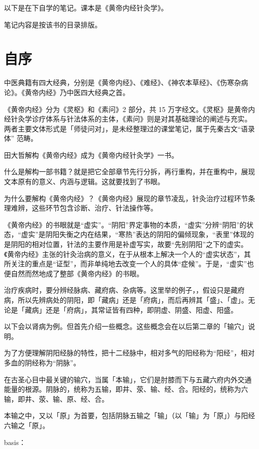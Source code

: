 \documentclass[
]{book}
\begin{document}
以下是在下自学的笔记。课本是《黄帝内经针灸学》。

笔记内容是按该书的目录排版。

\chapter{自序}\label{ux81eaux5e8f}

中医典籍有四大经典，分别是《黄帝内经》、《难经》、《神农本草经》、《伤寒杂病论》。《黄帝内经》乃中医四大经典之首。

《黄帝内经》分为《灵枢》和《素问》2 部分，共 15 万字经文。《灵枢》是黄帝内经针灸学诊疗体系与针法体系的主体，《素问》则是对其基础理论的阐述与充实。两者主要文体形式是「师徒问对」，是未经整理过的课堂笔记，属于先秦古文``语录体'' 范畴。

田大哲解构《黄帝内经》成为《黄帝内经针灸学》一书。

什么是解构一部书籍？就是把它全部章节先行分拆，再行重构，并在重构中，展现文本原有的意义、内涵与逻辑。这就要找到了书眼。

为什么要解构《黄帝内经》？《黄帝内经》展现的章节凌乱，针灸治疗过程环节条理难辨，这些环节包含诊断、治疗、针法操作等。

《黄帝内经》的书眼就是``虚实''。``阴阳''界定事物的本质，``虚实''分辨``阴阳''的状态，``虚实''是阴阳失衡之内在结果，``寒热''表达的阴阳的偏倾现象，``表里''体现的是阴阳的相对位置，针法的主要作用是补虚写实，故要``先别阴阳''之下的虚实。《黄帝内经》主张的针灸治病的意义，在于从根本上解决一个人的``虚实状态''，其所关注的重点是``证型''，而非单纯地去改变一个人的具体``症候''。于是，``虚实''也便自然而然地成了整部《黄帝内经》的书眼。

治疗疾病时，要分辨经脉病、藏府病、杂病等。这里举的例子，，假设只是藏府病，所以先辨病处的阴阳，即「藏病」还是「府病」，而后再辨其「盛」、「虚」。无论是「藏病」还是「府病」，其常证皆有四种，即阴虚、阴盛、阳虚、阳盛。

以下会以肾病为例。但首先介绍一些概念。这些概念会在以后第二章的「输穴」说明。

为了方便理解阴阳经脉的特性，把十二经脉中，相对多气的阳经称为``阳经''，相对多血的阴经称为``阴脉''。

在古圣心目中最关键的输穴，当属「本输」，它们是肘膝而下与五藏六府内外交通能量的根源。阴脉的，统称为五输，即井、荥、输、经、合。阳经的，统称为六输，即井、荥、输、原、经、合。

本输之中，又以「原」为首要，包括阴脉五输之「输」（以「输」为「原」）与阳经六输之「原」。

basis：
\end{document}
